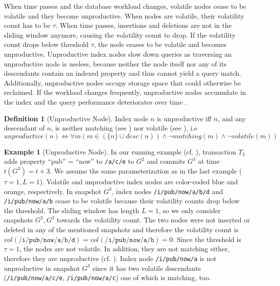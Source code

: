 \documentclass[abstracton,12pt]{scrartcl}
\theoremstyle{definition}
\newtheorem{definition}{Definition}
\newtheorem{example}{Example}
\begin{document}
When time passes and the database workload changes, volatile nodes cease to be
volatile and they become unproductive. When nodes are volatile, their volatility
count has to be $\tau$. When time passes, insertions and deletions are not in
the sliding window anymore, causing the volatility count to drop. If the
volatility count drops below threshold $\tau$, the node ceases to be volatile
and becomes unproductive. Unproductive index nodes slow down
queries as traversing an unproductive node is useless, because neither the node
itself nor any of its descendants contain an indexed property and thus cannot
yield a query match. Additionally, unproductive nodes occupy storage space that
could otherwise be reclaimed. If the workload changes frequently, unproductive
nodes accumulate in the index and the query performance deteriorates
over time \cite{KW17}.

\begin{definition}[Unproductive Node]
  Index node $n$ is unproductive iff $n$, and any descendant of
  $n$, is neither matching (see ) nor volatile (see
  ), i.e
  $$ unproductive(n) \iff \forall  m (m \in (\{n\} \cup desc(n)) \land
  \neg matching(m) \land \neg volatile(m))$$
  \label{def:unproductive-node}
\end{definition}

\begin{example}[Unproductive Node]
  In our running example (cf. ), transaction $T_3$ adds
  property ``pub'' = ``now'' to \texttt{/a/c/e} to $G^2$ and commits $G^3$ at time
  $t(G^3) = t+3$. We assume the same parameterization as in the last example
  ($\tau = 1, L = 1$). Volatile and unproductive index nodes are color-coded
  blue and orange, respectively.
  In snapshot $G^3$, index nodes \texttt{/i/pub/now/a/b/d} and
  \texttt{/i/pub/now/a/b} cease to be volatile because their 
  volatility counts drop below the threshold. The sliding window has length $L =
  1$, so we only consider snapshots $G^2,G^3$ towards the volatility count. The two
  nodes were not inserted or deleted in any of the mentioned snapshots and
  therefore the volatility count is $vol(\texttt{/i/pub/now/a/b/d}) =
  vol(\texttt{/i/pub/now/a/b}) = 0$. Since the threshold is $\tau = 1$, the nodes are
  not volatile. In addition,
  they are not matching either, therefore they are unproductive (cf.
  ). Index node
  \texttt{/i/pub/now/a} is not unproductive in snapshot $G^3$ since it has
  two volatile descendants (\texttt{/i/pub/now/a/c/e}, \texttt{/i/pub/now/a/c}) 
  one of which is matching, too.
  \label{ex:unproductive-node}
\end{example}
\end{document}
